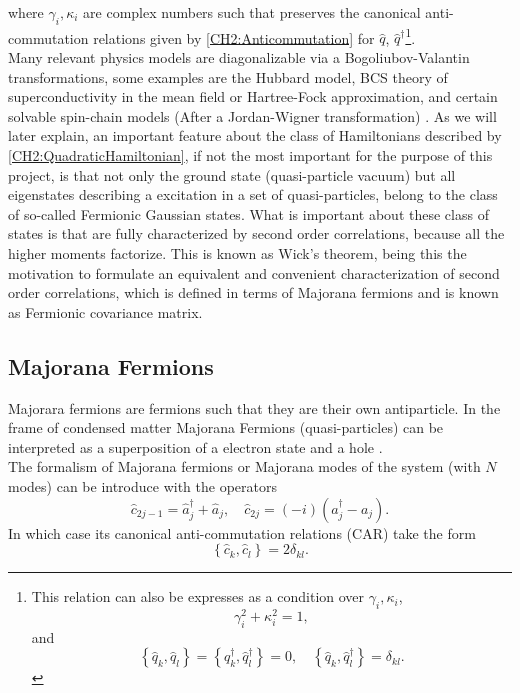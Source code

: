 where $\gamma_i , \kappa_i$ are complex numbers such that preserves the canonical anti-commutation relations given by \eqref{CH2:Anticommutation} for $\hat{q}$, $\hat{q}^{\dagger}$\footnote{This relation can also be expresses as a condition over $\gamma_i , \kappa_i$,
\[ \gamma_i ^2+ \kappa_i^2 = 1,\]
and 
\[\left\{\hat{q}_{k}, \hat{q}_{l}\right\}=\left\{\hat{q}_{k}^{\dagger}, \hat{q}_{l}^{\dagger}\right\}=0, \quad\left\{\hat{q}_{k}, \hat{q}_{l}^{\dagger}\right\}=\delta_{k l}.\]
 }.
\\
Many relevant physics models are diagonalizable via a Bogoliubov-Valantin transformations, some examples are the Hubbard model, BCS theory of superconductivity in the mean field or Hartree-Fock approximation, and certain solvable spin-chain models (After a Jordan-Wigner transformation) \cite{fradkin_field_1997}. As we will later explain, an important feature about the class of Hamiltonians described by \eqref{CH2:QuadraticHamiltonian}, if not the most important for the purpose of this project,  is that not only the ground state (quasi-particle vacuum)  but all eigenstates describing a excitation  in a set of quasi-particles, belong to the class of so-called Fermionic Gaussian states\cite{botero_bcs-like_2004}. What is important about these class of states is that are fully characterized by second order correlations, because all the higher moments factorize. This is known as Wick's theorem\cite{bravyi_classical_2005, molinari_notes_2017}, being this the motivation to formulate an equivalent and convenient characterization of second order correlations, which is defined in terms of Majorana fermions and is known as Fermionic covariance matrix.
\subsection*{Majorana Fermions}
Majorara fermions are fermions such that they are their own antiparticle. In the frame of condensed matter Majorana Fermions (quasi-particles) can be interpreted as a superposition of a electron state and a hole \cite{leijnse_introduction_2012}.
\\
The formalism of Majorana fermions or Majorana modes of the system (with $N$ modes) can be introduce with the operators
\begin{equation}
\hat{c}_{2j-1}=\hat{a}_{j}^{\dagger}+\hat{a}_{j}, \quad \hat{c}_{2j}=(-i)\left(a_{j}^{\dagger}-a_{j}\right).
\label{CH2:majorana}
\end{equation}
In which case its canonical anti-commutation relations (CAR) take the form
\begin{equation}
\left\{\hat{c}_{k},\hat{c}_{l}\right\}=2 \delta_{k l}.
\label{CH2:CAR_majorana}
\end{equation}

